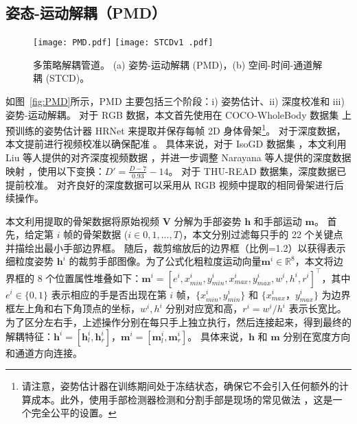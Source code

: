 \subsection{姿态-运动解耦（PMD）}
\label{sec:pose-motion}
\begin{figure}[tb]
\centering
\subcaptionbox{\label{fig:PMD}}
{\texttt{[image: PMD.pdf]}}
\subcaptionbox{\label{fig:STCD}}
{\texttt{[image: STCDv1 .pdf]}}
\caption{多策略解耦管道。 (a) 姿势-运动解耦 (PMD)，(b) 空间-时间-通道解耦 (STCD)。}
\label{fig:handdecomp}
\end{figure}

如图~\ref{fig:PMD}所示，PMD 主要包括三个阶段：i) 姿势估计、ii) 深度校准和 iii) 姿势-运动解耦。
对于 RGB 数据，本文首先使用在 COCO-WholeBody 数据集 \cite{jin2020whole} 上预训练的姿势估计器 HRNet \cite{sun2019deep} 来提取并保存每帧 2D 身体骨架\footnote{请注意，姿势估计器在训练期间处于冻结状态，确保它不会引入任何额外的计算成本。此外，使用手部检测器检测和分割手部是现场的常见做法 \cite{AVOLA2022108762,zhou2021regional,chen2022multi}，这是一个完全公平的设置。}。
对于深度数据，本文提前进行视频校准以确保配准 \cite{liu2017continuous}。
具体来说，对于 IsoGD 数据集 \cite{wan2016chalearn}，本文利用 Liu 等人提供的对齐深度视频数据 \cite{liu2017continuous}，并进一步调整 Narayana 等人提供的深度数据映射 \cite{narayana2018focus}，使用以下变换：$D'=\frac{D-7}{0.93}-14$。
对于 THU-READ 数据集，深度数据已提前校准。
对齐良好的深度数据可以采用从 RGB 视频中提取的相同骨架进行后续操作。

本文利用提取的骨架数据将原始视频 $\mathbf{V}$ 分解为手部姿势 $\mathbf{h}$ 和手部运动 $\mathbf{m}$。
首先，给定第 $i$ 帧的骨架数据 ($i \in 0, 1, ..., T$)，本文分别过滤每只手的 22 个关键点并描绘出最小手部边界框。
随后，裁剪缩放后的边界框（比例=1.2）以获得表示细粒度姿势 $\mathbf{h}^{i}$ 的裁剪手部图像。为了公式化粗粒度运动向量$\mathbf{m}^{i} \in \mathbb{R}^{8}$，本文将边界框的 8 个位置属性堆叠如下：$\mathbf{m}^{i} = \left[e^{i}, x^{i}_{min}, y^{i}_{min}, x^{i}_{max}, y^{i}_{max}, w^{i}, h^{i}, r^{i}\right]^{\top}$，其中 $e^{i} \in \{0, 1\}$ 表示相应的手是否出现在第 $i$ 帧，$\{x^{i}_{min}, y^{i}_{min}\}$ 和 $\{x^{i}_{max}， y^{i}_{max}\}$ 为边界框左上角和右下角顶点的坐标，$w^{i}, h^{i}$ 分别对应宽和高，$r^{i}=w^{i}/h^{i}$ 表示长宽比。
为了区分左右手，上述操作分别在每只手上独立执行，然后连接起来，得到最终的解耦特征：$\mathbf{h}^{i} = \left[\mathbf{h}^{i}_l, \mathbf{h}^{i}_r\right]$，$\mathbf{m}^{i} = \left[\mathbf{m}^{i}_l, \mathbf{m}^{i}_r\right]$。
具体来说，$\mathbf{h}$ 和 $\mathbf{m}$ 分别在宽度方向和通道方向连接。

